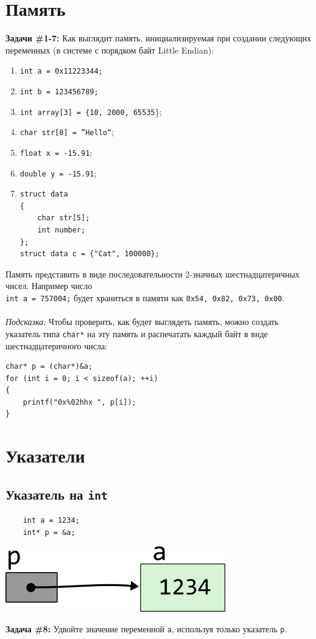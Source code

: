 \documentclass{article}
\begin{document}
\section*{Память}
\textbf{Задачи \#1-7:} Как выглядит память, инициализируемая при создании следующих переменных (в системе с порядком байт Little Endian):
\begin{multicols}{2}
\begin{enumerate}
\item \texttt{int a = 0x11223344;}
\item \texttt{int b = 123456789;}
\item \texttt{int array[3] = \{10, 2000, 65535}\};
\item \texttt{char str[8] = ''Hello``};
\item \texttt{float x = -15.91};
\item \texttt{double y = -15.91};
\item
\begin{verbatim}
struct data
{
    char str[5];
    int number;
};
struct data c = {"Cat", 100000};
\end{verbatim}
\end{enumerate}
\end{multicols}
Память представить в виде последовательности 2-значных шестнадцатеричных чисел. Например число \\
\texttt{int a = 757004;} будет храниться в памяти как \texttt{0x54, 0x82, 0x73, 0x00}. \\ \\
\textit{Подсказка:} Чтобы проверить, как будет выглядеть память, можно создать указатель типа \texttt{char*} на эту память и распечатать каждый байт в виде шестнадцатеричного числа:
\begin{lstlisting}
char* p = (char*)&a;
for (int i = 0; i < sizeof(a); ++i)
{
    printf("0x%02hhx ", p[i]);
}
\end{lstlisting}

\section*{Указатели}

\subsection*{Указатель на \texttt{int}}
\begin{multicols}{2}
\begin{lstlisting}
	int a = 1234;
	int* p = &a;
\end{lstlisting}
\columnbreak
\begin{center}
\includegraphics[scale=1]{../images/pointer_schemes/pointer_to_int.png}
\end{center}
\end{multicols}
\textbf{Задача \#8:} Удвойте значение переменной \texttt{a}, используя только указатель \texttt{p}.
\end{document}
